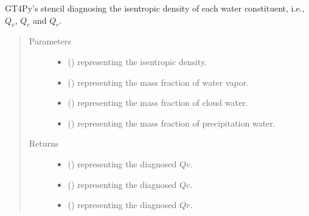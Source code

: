 \documentclass[letterpaper,10pt,english]{sphinxmanual}
\begin{document}
\begin{fulllineitems}
\begin{fulllineitems}
\label{\detokenize{api:dycore.diagnostic_isentropic.DiagnosticIsentropic._stencil_diagnosing_water_constituents_isentropic_density_defs}}
GT4Py’s stencil diagnosing the isentropic density of each water constituent, i.e.,
\(Q_v\), \(Q_c\) and \(Q_r\).
\begin{quote}\begin{description}
\item[{Parameters}] \leavevmode\begin{itemize}
\item {} 
 () \textendash{}  representing the isentropic density.

\item {} 
 () \textendash{}  representing the mass fraction of water vapor.

\item {} 
 () \textendash{}  representing the mass fraction of cloud water.

\item {} 
 () \textendash{}  representing the mass fraction of precipitation water.

\end{itemize}

\item[{Returns}] \leavevmode
\begin{itemize}
\item {} 
 () \textendash{}  representing the diagnosed \(Qv\).

\item {} 
 () \textendash{}  representing the diagnosed \(Qc\).

\item {} 
 () \textendash{}  representing the diagnosed \(Qr\).


\end{itemize}
\end{description}
\end{quote}
\end{fulllineitems}
\end{fulllineitems}
\end{document}
